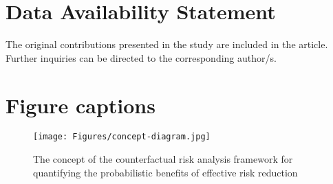 \documentclass[utf8]{frontiersSCNS} %
\begin{document}



\section*{Data Availability Statement}
The original contributions presented in the study are included in the article. Further inquiries can be directed to the corresponding author/s.




\section*{Figure captions}

\begin{figure}[h!] 
\begin{center}
    \texttt{[image: Figures/concept-diagram.jpg]}
    \caption{The concept of the counterfactual risk analysis framework for quantifying the probabilistic benefits of effective risk reduction}
    \label{fig:conceptual_diagram}
\end{center}
\end{figure}
\end{document}
